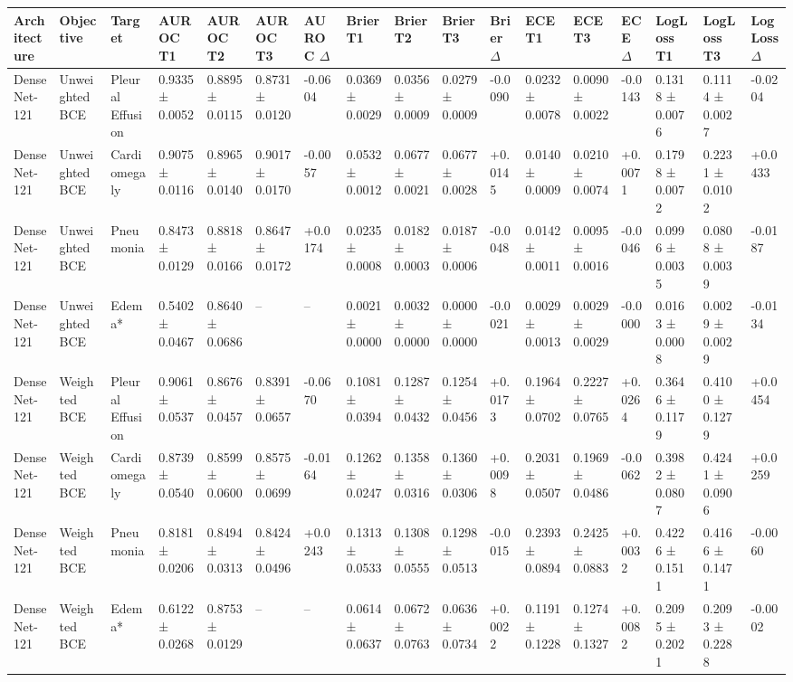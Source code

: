 \begin{tabular}{lllllllllllllllll}
\toprule
Architecture & Objective & Target & AUROC T1 & AUROC T2 & AUROC T3 & AUROC $\Delta$ & Brier T1 & Brier T2 & Brier T3 & Brier $\Delta$ & ECE T1 & ECE T3 & ECE $\Delta$ & LogLoss T1 & LogLoss T3 & LogLoss $\Delta$ \\
\midrule
DenseNet-121 & Unweighted BCE & Pleural Effusion & 0.9335 ± 0.0052 & 0.8895 ± 0.0115 & 0.8731 ± 0.0120 & -0.0604 & 0.0369 ± 0.0029 & 0.0356 ± 0.0009 & 0.0279 ± 0.0009 & -0.0090 & 0.0232 ± 0.0078 & 0.0090 ± 0.0022 & -0.0143 & 0.1318 ± 0.0076 & 0.1114 ± 0.0027 & -0.0204 \\
DenseNet-121 & Unweighted BCE & Cardiomegaly & 0.9075 ± 0.0116 & 0.8965 ± 0.0140 & 0.9017 ± 0.0170 & -0.0057 & 0.0532 ± 0.0012 & 0.0677 ± 0.0021 & 0.0677 ± 0.0028 & +0.0145 & 0.0140 ± 0.0009 & 0.0210 ± 0.0074 & +0.0071 & 0.1798 ± 0.0072 & 0.2231 ± 0.0102 & +0.0433 \\
DenseNet-121 & Unweighted BCE & Pneumonia & 0.8473 ± 0.0129 & 0.8818 ± 0.0166 & 0.8647 ± 0.0172 & +0.0174 & 0.0235 ± 0.0008 & 0.0182 ± 0.0003 & 0.0187 ± 0.0006 & -0.0048 & 0.0142 ± 0.0011 & 0.0095 ± 0.0016 & -0.0046 & 0.0996 ± 0.0035 & 0.0808 ± 0.0039 & -0.0187 \\
DenseNet-121 & Unweighted BCE & Edema* & 0.5402 ± 0.0467 & 0.8640 ± 0.0686 & -- & -- & 0.0021 ± 0.0000 & 0.0032 ± 0.0000 & 0.0000 ± 0.0000 & -0.0021 & 0.0029 ± 0.0013 & 0.0029 ± 0.0029 & -0.0000 & 0.0163 ± 0.0008 & 0.0029 ± 0.0029 & -0.0134 \\
DenseNet-121 & Weighted BCE & Pleural Effusion & 0.9061 ± 0.0537 & 0.8676 ± 0.0457 & 0.8391 ± 0.0657 & -0.0670 & 0.1081 ± 0.0394 & 0.1287 ± 0.0432 & 0.1254 ± 0.0456 & +0.0173 & 0.1964 ± 0.0702 & 0.2227 ± 0.0765 & +0.0264 & 0.3646 ± 0.1179 & 0.4100 ± 0.1279 & +0.0454 \\
DenseNet-121 & Weighted BCE & Cardiomegaly & 0.8739 ± 0.0540 & 0.8599 ± 0.0600 & 0.8575 ± 0.0699 & -0.0164 & 0.1262 ± 0.0247 & 0.1358 ± 0.0316 & 0.1360 ± 0.0306 & +0.0098 & 0.2031 ± 0.0507 & 0.1969 ± 0.0486 & -0.0062 & 0.3982 ± 0.0807 & 0.4241 ± 0.0906 & +0.0259 \\
DenseNet-121 & Weighted BCE & Pneumonia & 0.8181 ± 0.0206 & 0.8494 ± 0.0313 & 0.8424 ± 0.0496 & +0.0243 & 0.1313 ± 0.0533 & 0.1308 ± 0.0555 & 0.1298 ± 0.0513 & -0.0015 & 0.2393 ± 0.0894 & 0.2425 ± 0.0883 & +0.0032 & 0.4226 ± 0.1511 & 0.4166 ± 0.1471 & -0.0060 \\
DenseNet-121 & Weighted BCE & Edema* & 0.6122 ± 0.0268 & 0.8753 ± 0.0129 & -- & -- & 0.0614 ± 0.0637 & 0.0672 ± 0.0763 & 0.0636 ± 0.0734 & +0.0022 & 0.1191 ± 0.1228 & 0.1274 ± 0.1327 & +0.0082 & 0.2095 ± 0.2021 & 0.2093 ± 0.2288 & -0.0002 \\

\end{tabular}
